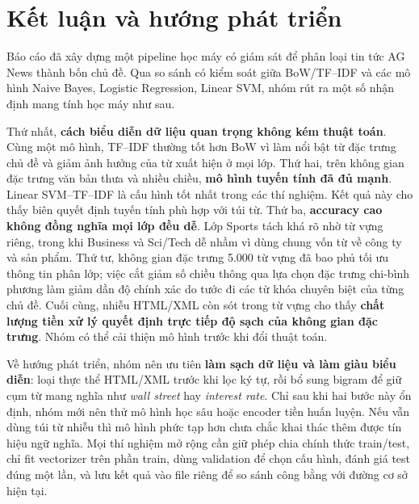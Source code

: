 \documentclass[12pt]{hcmut-report}
\newcommand{\firstparagraph}{\noindent\hspace*{2em}}
\begin{document}
\section{Kết luận và hướng phát triển}

\firstparagraph Báo cáo đã xây dựng một pipeline học máy có giám sát để phân loại tin tức AG News thành bốn chủ đề. Qua so sánh có kiểm soát giữa BoW/TF--IDF và các mô hình Naive Bayes, Logistic Regression, Linear SVM, nhóm rút ra một số nhận định mang tính học máy như sau.

Thứ nhất, \textbf{cách biểu diễn dữ liệu quan trọng không kém thuật toán}. Cùng một mô hình, TF--IDF thường tốt hơn BoW vì làm nổi bật từ đặc trưng chủ đề và giảm ảnh hưởng của từ xuất hiện ở mọi lớp. Thứ hai, trên không gian đặc trưng văn bản thưa và nhiều chiều, \textbf{mô hình tuyến tính đã đủ mạnh}. Linear SVM--TF--IDF là cấu hình tốt nhất trong các thí nghiệm. Kết quả này cho thấy biên quyết định tuyến tính phù hợp với túi từ. Thứ ba, \textbf{accuracy cao không đồng nghĩa mọi lớp đều dễ}. Lớp Sports tách khá rõ nhờ từ vựng riêng, trong khi Business và Sci/Tech dễ nhầm vì dùng chung vốn từ về công ty và sản phẩm. Thứ tư, không gian đặc trưng 5.000 từ vựng đã bao phủ tối ưu thông tin phân lớp; việc cắt giảm số chiều thông qua lựa chọn đặc trưng chi-bình phương làm giảm dần độ chính xác do tước đi các từ khóa chuyên biệt của từng chủ đề. Cuối cùng, nhiễu HTML/XML còn sót trong từ vựng cho thấy \textbf{chất lượng tiền xử lý quyết định trực tiếp độ sạch của không gian đặc trưng}. Nhóm có thể cải thiện mô hình trước khi đổi thuật toán.

Về hướng phát triển, nhóm nên ưu tiên \textbf{làm sạch dữ liệu và làm giàu biểu diễn}: loại thực thể HTML/XML trước khi lọc ký tự, rồi bổ sung bigram để giữ cụm từ mang nghĩa như \textit{wall street} hay \textit{interest rate}. Chỉ sau khi hai bước này ổn định, nhóm mới nên thử mô hình học sâu hoặc encoder tiền huấn luyện. Nếu vẫn dùng túi từ nhiễu thì mô hình phức tạp hơn chưa chắc khai thác thêm được tín hiệu ngữ nghĩa. Mọi thí nghiệm mở rộng cần giữ phép chia chính thức train/test, chỉ fit vectorizer trên phần train, dùng validation để chọn cấu hình, đánh giá test đúng một lần, và lưu kết quả vào file riêng để so sánh công bằng với đường cơ sở hiện tại.
\end{document}
